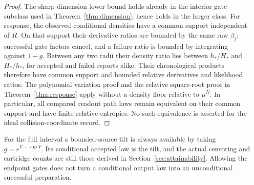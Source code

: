 \begin{proof}
The sharp dimension lower bound holds already in the interior gate subclass
used in Theorem~\ref{thm:dimension}, hence holds in the larger class.
For response, the observed conditional densities have a common support
independent of $R$. On that support their derivative ratios are bounded by
the same raw $\beta_j$: successful gate factors cancel, and a failure ratio
is bounded by integrating against $1-g$. Between any two radii their density
ratio lies between $h_*/H_*$ and $H_*/h_*$, for accepted and failed reports
alike. Their chronological products therefore have common support and
bounded relative derivatives and likelihood ratios. The polynomial
variation proof and the relative square-root proof in
Theorem~\ref{thm:response} apply without a density floor relative to $\mu^N$.
In particular, all compared readout path laws remain equivalent on their
common support and have finite relative entropies. No such equivalence is
asserted for the ideal collision-coordinate record.
\end{proof}

For the full interval a bounded-source tilt is always available by taking
$g=e^{V-\sup V}$. Its conditional accepted law is the tilt, and the actual
censoring and cartridge counts are still those derived in
Section~\ref{sec:attainability}. Allowing the endpoint gates does not turn a
conditional output law into an unconditional successful preparation.
